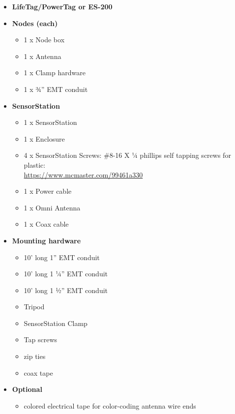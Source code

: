 \documentclass[
]{article}
\providecommand{\tightlist}{%
  \setlength{\itemsep}{0pt}\setlength{\parskip}{0pt}}
\begin{document}
\begin{itemize}
\tightlist
\item
  \textbf{LifeTag/PowerTag or ES-200}
\item
  \textbf{Nodes (each)}

  \begin{itemize}
  \tightlist
  \item
    1 x Node box
  \item
    1 x Antenna
  \item
    1 x Clamp hardware
  \item
    1 x ¾'' EMT conduit
  \end{itemize}
\item
  \textbf{SensorStation}

  \begin{itemize}
  \tightlist
  \item
    1 x SensorStation
  \item
    1 x Enclosure
  \item
    4 x SensorStation Screws: \#8-16 X ¼ phillips self tapping screws
    for plastic:\\
    \url{https://www.mcmaster.com/99461a330}
  \item
    1 x Power cable
  \item
    1 x Omni Antenna
  \item
    1 x Coax cable
  \end{itemize}
\item
  \textbf{Mounting hardware}

  \begin{itemize}
  \tightlist
  \item
    10' long 1'' EMT conduit
  \item
    10' long 1 ¼'' EMT conduit
  \item
    10' long 1 ½'' EMT conduit
  \item
    Tripod
  \item
    SensorStation Clamp
  \item
    Tap screws
  \item
    zip ties
  \item
    coax tape
  \end{itemize}
\item
  \textbf{Optional}

  \begin{itemize}
  \tightlist
  \item
    colored electrical tape for color-coding antenna wire ends
  \end{itemize}
\end{itemize}
\end{document}
